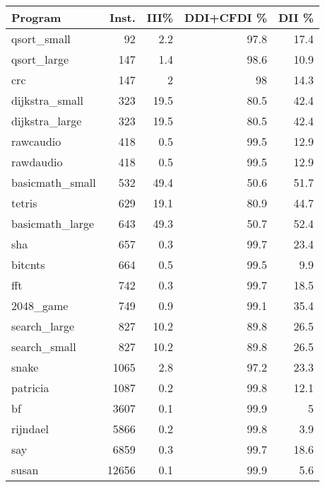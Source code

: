 \begin{tabular}{|l|r|r|r|r|}
\hline
 Program         &   Inst. &   III\% &   DDI+CFDI \% &   DII \% \\
\hline
 qsort\_small     &      92 &    2.2 &         97.8 &    17.4 \\
\hline
 qsort\_large     &     147 &    1.4 &         98.6 &    10.9 \\
\hline
 crc             &     147 &    2   &         98   &    14.3 \\
\hline
 dijkstra\_small  &     323 &   19.5 &         80.5 &    42.4 \\
\hline
 dijkstra\_large  &     323 &   19.5 &         80.5 &    42.4 \\
\hline
 rawcaudio       &     418 &    0.5 &         99.5 &    12.9 \\
\hline
 rawdaudio       &     418 &    0.5 &         99.5 &    12.9 \\
\hline
 basicmath\_small &     532 &   49.4 &         50.6 &    51.7 \\
\hline
 tetris          &     629 &   19.1 &         80.9 &    44.7 \\
\hline
 basicmath\_large &     643 &   49.3 &         50.7 &    52.4 \\
\hline
 sha             &     657 &    0.3 &         99.7 &    23.4 \\
\hline
 bitcnts         &     664 &    0.5 &         99.5 &     9.9 \\
\hline
 fft             &     742 &    0.3 &         99.7 &    18.5 \\
\hline
 2048\_game       &     749 &    0.9 &         99.1 &    35.4 \\
\hline
 search\_large    &     827 &   10.2 &         89.8 &    26.5 \\
\hline
 search\_small    &     827 &   10.2 &         89.8 &    26.5 \\
\hline
 snake           &    1065 &    2.8 &         97.2 &    23.3 \\
\hline
 patricia        &    1087 &    0.2 &         99.8 &    12.1 \\
\hline
 bf              &    3607 &    0.1 &         99.9 &     5   \\
\hline
 rijndael        &    5866 &    0.2 &         99.8 &     3.9 \\
\hline
 say             &    6859 &    0.3 &         99.7 &    18.6 \\
\hline
 susan           &   12656 &    0.1 &         99.9 &     5.6 \\

\end{tabular}
